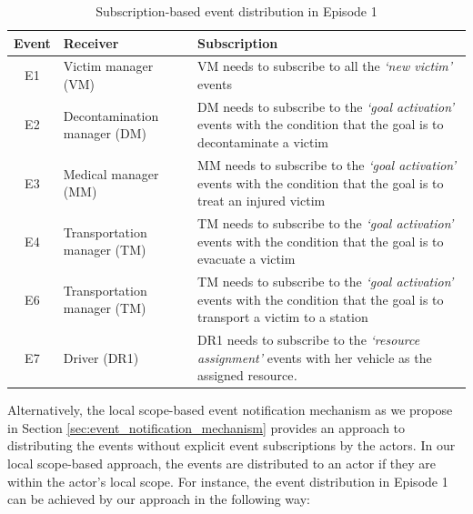 \begin{table}[htbp]
\centering
\footnotesize
\begin{tabular}{c>{\raggedright}p{2in}>{\raggedright}p{2.5in}}

\toprule 
\textbf{Event} & \textbf{Receiver} & \textbf{Subscription}\tabularnewline
\midrule 
E1  & Victim manager (VM) & VM needs to subscribe to all the \emph{`new victim'} events\tabularnewline
\midrule 
E2 & Decontamination manager (DM) & DM needs to subscribe to the \emph{`goal activation'} events with
the condition that the goal is to decontaminate a victim\tabularnewline
\midrule 
E3 & Medical manager (MM) & MM needs to subscribe to the \emph{`goal activation'} events with
the condition that the goal is to treat an injured victim\tabularnewline
\midrule 
E4 & Transportation manager (TM) & TM needs to subscribe to the \emph{`goal activation'} events with
the condition that the goal is to evacuate a victim\tabularnewline
\midrule 
E6 & Transportation manager (TM) & TM needs to subscribe to the \emph{`goal activation'} events with
the condition that the goal is to transport a victim to a station\tabularnewline
\midrule 
E7 & Driver (DR1) & DR1 needs to subscribe to the \emph{`resource assignment' }events
with her vehicle as the assigned resource\emph{.}\tabularnewline
\bottomrule

\end{tabular}	
\caption{Subscription-based event distribution in Episode 1}
\label{tab:episode_1_subscriptions}
\end{table}

Alternatively, the local scope-based event notification mechanism as we propose in Section \ref{sec:event_notification_mechanism} provides an approach to distributing the events without explicit event subscriptions by the actors. In our local scope-based approach, the events are distributed to an actor if they are within the actor's local scope. For instance, the event distribution in Episode 1 can be achieved by our approach in the following way:


